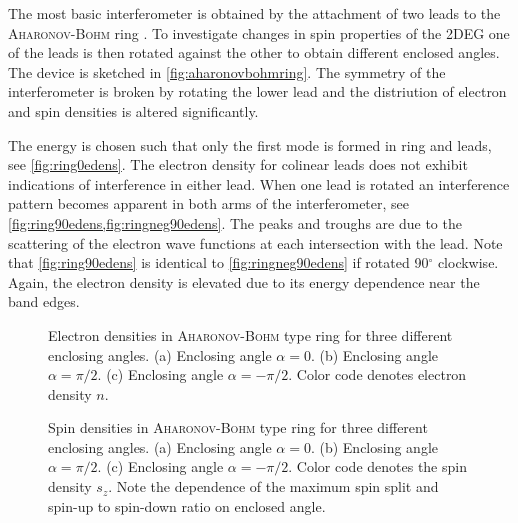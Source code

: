 The most basic interferometer is obtained by the attachment of two leads to the \textsc{Aharonov-Bohm} ring \cite{PhysRevLett.79.273}. To investigate changes in spin properties of the 2DEG one of the leads is then rotated against the other to obtain different enclosed angles. The device is sketched in \cref{fig:aharonovbohmring}. The symmetry of the interferometer is broken by rotating the lower lead and the distriution of electron and spin densities is altered significantly.\par
The energy is chosen such that only the first mode is formed in ring and leads, see \cref{fig:ring0edens}. The electron density for colinear leads does not exhibit indications of interference in either lead. When one lead is rotated an interference pattern becomes apparent in both arms of the interferometer, see \cref{fig:ring90edens,fig:ringneg90edens}. The peaks and troughs are due to the scattering of the electron wave functions at each intersection with the lead. Note that \cref{fig:ring90edens} is identical to \cref{fig:ringneg90edens} if rotated 90$^{\circ}$ clockwise. Again, the electron density is elevated due to its energy dependence near the band edges.\par
\begin{figure}[h!]
  \caption{Electron densities in \textsc{Aharonov-Bohm} type ring for three different enclosing angles. (a) Enclosing angle $\alpha=0$. (b) Enclosing angle $\alpha=\pi/2$. (c) Enclosing angle $\alpha=-\pi/2$. Color code denotes electron density $n$.} 
\end{figure}
\begin{figure}[h!]
  \caption{Spin densities in \textsc{Aharonov-Bohm} type ring for three different enclosing angles. (a) Enclosing angle $\alpha=0$. (b) Enclosing angle $\alpha=\pi/2$. (c) Enclosing angle $\alpha=-\pi/2$. Color code denotes the spin density $s_z$. Note the dependence of the maximum spin split and spin-up to spin-down ratio on enclosed angle.}
\end{figure}
